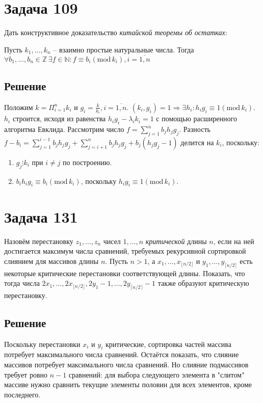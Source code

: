 \documentclass[11pt]{article}
\author{Sergey Makarov}
\date{\today}
\title{}
\newcounter{th}\setcounter{th}{0}
\begin{document}
\section{Задача 109}
\label{sec:org15ea6cc}
Дать конструктивное доказательство \emph{китайской теоремы об остатках}:

Пусть \(k_1, \ldots, k_n\) -- взаимно простые натуральные числа. Тогда
\(\forall b_1, \ldots, b_n \in \mathbb{Z}\, \exists f \in \mathbb{N}: f \equiv b_i (\text{mod}\, k_i), i = \overline{1, n}\)
\subsection{Решение}
\label{sec:orgbc5eb05}
Положим \(k = \Pi_{i = 1}^nk_i\) и \(g_i = \frac{k}{k_i}, i = \overline{1, n}\).
\((k_i, g_i) = 1 \Rightarrow \exists h_i: h_ig_i \equiv 1 (\text{mod}\, k_i)\). \(h_i\) строится,
исходя из равенства \(h_ig_i - \lambda_ik_i = 1\)  с помощью расширенного алгоритма Евклида.
Рассмотрим число \(f = \sum_{j = 1}^nb_jh_jg_j\). Разность
\(f - b_i = \sum_{j = 1}^{i - 1}b_jh_jg_j + \sum_{j = i + 1}^nb_jh_jg_j + b_j(h_jg_j - 1)\)
делится на \(k_i\), поскольку:
\begin{enumerate}
\item \(g_j \vdots k_i\) при \(i \neq j\) по построению.
\item \(b_ih_ig_i \equiv b_i(\text{mod}\, k_i)\), поскольку \(h_ig_i \equiv 1(\text{mod}\, k_i)\).
\end{enumerate}
\section{Задача 131}
\label{sec:orga0c31ec}
Назовём перестановку \(z_1, \ldots, z_n\) чисел \(1, \ldots, n\) \emph{критической} длины \(n\), если на
ней достигается максимум числа сравнений, требуемых рекурсивной сортировкой слиянием для
массивов длины \(n\). Пусть \(n > 1\), а \(x_1, \ldots, x_{\lfloor n/2\rfloor}\) и
\(y_1, \ldots, y_{\lceil n/2\rceil}\) есть некоторые критические перестановки соответствующей
длины. Показать, что тогда числа
\(2x_1, \ldots, 2x_{\lfloor n/2\rfloor}, 2y_1 - 1, \ldots, 2y_{\lceil n/2\rceil} - 1\) также
образуют критическую перестановку.
\subsection{Решение}
\label{sec:orgfdd146e}
Поскольку перестановки \(x_i\) и \(y_i\) критические, сортировка частей массива потребует
максимального числа сравнений. Остаётся показать, что слияние массивов потребует максимального
числа сравнений. Но слияние подмассивов требует ровно \(n - 1\) сравнений: для выбора следующего
элемента в "слитом" массиве нужно сравнить текущие элементы половин для всех элементов, кроме
последнего.
\end{document}
